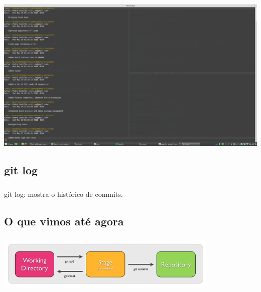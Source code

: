 \documentclass[aspectratio=169]{beamer}
\makeatletter
\newcommand*{\currentname}{\@currentlabelname}
\makeatother
\begin{document}
\begin{frame}
  \frametitle{\currentname}
  \begin{center}
    \includegraphics[height=0.8\textheight]{img/git-log.png}
  \end{center}
\end{frame}

\subsection{git log}
\begin{frame}
  \frametitle{\currentname}
  \begin{itemize}
  \end{itemize}
\end{frame}

\begin{frame}
  \frametitle{\currentname}
  \begin{center}
    {\Huge git log: mostra o histórico de commits.}
  \end{center}
\end{frame}

\subsection{O que vimos até agora}
\begin{frame}
  \frametitle{\currentname}
  \begin{center}
    \includegraphics[width=0.8\textwidth]{img/git-add-reset-commit.png}
  \end{center}
\end{frame}
\end{document}
